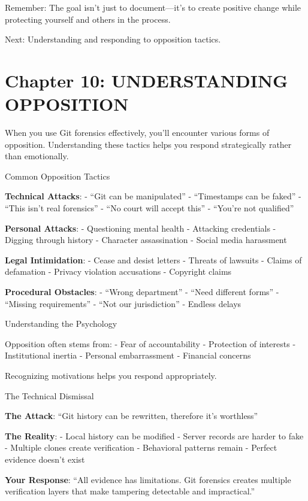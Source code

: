 Remember: The goal isn't just to document---it's to create positive
change while protecting yourself and others in the process.

Next: Understanding and responding to opposition tactics.

\section{Chapter 10: UNDERSTANDING
OPPOSITION}\label{chapter-10-understanding-opposition}

When you use Git forensics effectively, you'll encounter various forms
of opposition. Understanding these tactics helps you respond
strategically rather than emotionally.

Common Opposition Tactics

\textbf{Technical Attacks}: - ``Git can be manipulated'' - ``Timestamps
can be faked'' - ``This isn't real forensics'' - ``No court will accept
this'' - ``You're not qualified''

\textbf{Personal Attacks}: - Questioning mental health - Attacking
credentials - Digging through history - Character assassination - Social
media harassment

\textbf{Legal Intimidation}: - Cease and desist letters - Threats of
lawsuits - Claims of defamation - Privacy violation accusations -
Copyright claims

\textbf{Procedural Obstacles}: - ``Wrong department'' - ``Need different
forms'' - ``Missing requirements'' - ``Not our jurisdiction'' - Endless
delays

Understanding the Psychology

Opposition often stems from: - Fear of accountability - Protection of
interests - Institutional inertia - Personal embarrassment - Financial
concerns

Recognizing motivations helps you respond appropriately.

The Technical Dismissal

\textbf{The Attack}: ``Git history can be rewritten, therefore it's
worthless''

\textbf{The Reality}: - Local history can be modified - Server records
are harder to fake - Multiple clones create verification - Behavioral
patterns remain - Perfect evidence doesn't exist

\textbf{Your Response}: ``All evidence has limitations. Git forensics
creates multiple verification layers that make tampering detectable and
impractical.''

